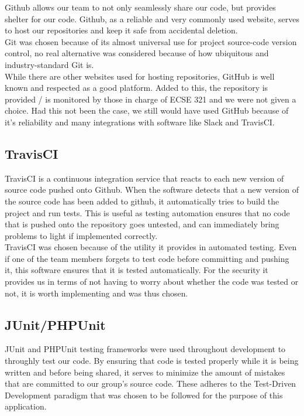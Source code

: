 \documentclass[12pt]{report}
\begin{document}
Github allows our team to not only seamlessly share our code, but provides shelter for our code.
Github, as a reliable  and very commonly used website, serves to host our repositories and keep it
safe from accidental deletion.\\

Git was chosen because of its almost universal use for project source-code version control, no
real alternative was considered because of how ubiquitous and industry-standard Git is.\\

While there are other websites used for hosting repositories, GitHub is well known and respected as
a good platform. Added to this, the repository is provided / is monitored by those in charge of ECSE
321 and we were not given a choice. Had this not been the case, we still would have used GitHub
because of it's reliability and many integrations with software like Slack and TravisCI.

\subsection{TravisCI}
TravisCI is a continuous integration service that reacts to each new version of source code pushed
onto Github. When the software detects that a new version of the source code has been added to
github, it automatically tries to build the project and run tests. This is useful as testing
automation ensures that no code that is pushed onto the repository goes untested, and can
immediately bring problems to light if implemented correctly.\\

TravisCI was chosen because of the utility it provides in automated testing. Even if one of the team
members forgets to test code before committing and pushing it, this software ensures that it is
tested automatically. For the security it provides us in terms of not having to worry about whether
the code was tested or not, it is worth implementing and was thus chosen.

\subsection{JUnit/PHPUnit}
JUnit and PHPUnit testing frameworks were used throughout development to throughly test our code. By
ensuring that code is tested properly while it is being written and before being shared, it serves
to minimize the amount of mistakes that are committed to our group's source code. These adheres to
the Test-Driven Development paradigm that was chosen to be followed for the purpose of this
application.
\end{document}
